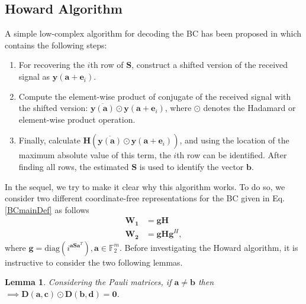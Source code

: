 \documentclass[lettersize,journal,onecolumn]{IEEEtran}
\newtheorem{lemma}{Lemma}
\begin{document}
\subsection{Howard Algorithm}
A simple low-complex algorithm for decoding the BC has been proposed in \cite{HowardAlg08} which contains the following steps:
\begin{enumerate}
	\item For recovering the $i$th row of $\mathbf{S}$, construct a shifted version of the received signal as $\mathbf{y}\left(\mathbf{a+e}_i\right)$.
	\item Compute the element-wise product of conjugate of the received signal with the shifted version: $\overline{\mathbf{y}\left(\mathbf{a}\right)} \odot \mathbf{y}\left(\mathbf{a+e}_i\right)$, where $\odot$ denotes the Hadamard or element-wise product operation.
	\item Finally, calculate $\mathbf{H} \left(\overline{\mathbf{y}\left(\mathbf{a}\right)}\odot\mathbf{y}\left(\mathbf{a+e}_i\right)\right)$, and using the location of the maximum absolute value of this term, the $i$th row can be identified. After finding all rows, the estimated $\mathbf{S}$ is used to identify the vector $\mathbf{b}$.
\end{enumerate}
In the sequel, we try to make it clear why this algorithm works. To do so, we consider two different coordinate-free representations for the BC given in Eq. \eqref{BCmainDef} as follows
\begin{align}
	\mathbf{W_1} & = \mathbf{g H} \label{firstCoFreeBC} \\
	\mathbf{W_2} & = \mathbf{g H g}^H \label{SecondCoFreeBC},
\end{align}
  where $\mathbf{g} = \text{diag}\left(i^{\mathbf{a S a}^T}\right), \mathbf{a}\in \mathbb{F}_2^m$. Before investigating the Howard algorithm, it is instructive to consider the two following lemmas. 
 \begin{lemma}\label{LemabEqual}
 	Considering the Pauli matrices, if $\mathbf{a}\neq \mathbf{b}$ then $\implies \mathbf{D}(\mathbf{a}, \mathbf{c}) \odot \mathbf{D}(\mathbf{b}, \mathbf{d}) = \mathbf{0}$.
 \end{lemma}
\end{document}
